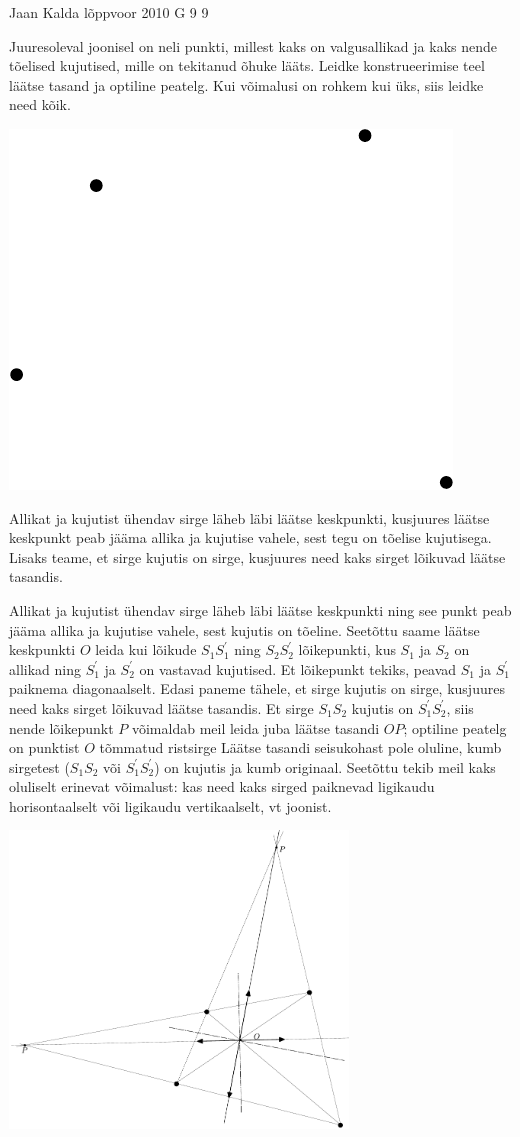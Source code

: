 {Jaan Kalda} %
{lõppvoor} %
{2010} %
{G 9} %
{9} %
{
\ifStatement
Juuresoleval joonisel on neli punkti, millest kaks on valgusallikad ja kaks nende tõelised kujutised, mille on tekitanud õhuke lääts. Leidke konstrueerimise teel läätse tasand ja optiline peatelg. Kui võimalusi on rohkem kui üks, siis leidke need kõik.

\begin{center}
	\includegraphics[width=0.3\linewidth]{2010-v3g-09-punktid}
\end{center}
\fi


\ifHint
Allikat ja kujutist ühendav sirge läheb läbi läätse keskpunkti, kusjuures läätse keskpunkt peab jääma allika ja kujutise vahele, sest tegu on tõelise kujutisega. Lisaks teame, et sirge kujutis on sirge, kusjuures need kaks sirget lõikuvad läätse tasandis.
\fi


\ifSolution
Allikat ja kujutist ühendav sirge läheb läbi läätse keskpunkti ning see punkt peab jääma allika ja kujutise vahele, sest kujutis on tõeline.
Seetõttu saame läätse keskpunkti $O$ leida kui lõikude $S_1S_1^\prime$ ning $S_2S_2^\prime$ lõikepunkti, kus $S_1$ ja $S_2$ on allikad ning $S_1^\prime$ ja $S_2^\prime$
on vastavad kujutised. Et lõikepunkt tekiks, peavad $S_1$ ja $S_1^\prime$ paiknema diagonaalselt. Edasi paneme tähele, et sirge kujutis on sirge, kusjuures
need kaks sirget lõikuvad läätse tasandis. Et sirge $S_1S_2$ kujutis on $S_1^\prime S_2^\prime$, siis nende lõikepunkt $P$ võimaldab meil leida juba
läätse tasandi $OP$; optiline peatelg on punktist $O$ tõmmatud ristsirge Läätse tasandi seisukohast pole oluline, kumb sirgetest ($S_1S_2$ või $S_1^\prime S_2^\prime$) on kujutis ja kumb originaal.
Seetõttu tekib meil kaks oluliselt erinevat võimalust: kas need kaks sirged paiknevad ligikaudu horisontaalselt või ligikaudu vertikaalselt, vt joonist.\\

\begin{center}
	\includegraphics[width=90mm]{2010-v3g-09-punktid_lah}
\end{center}
\fi
}